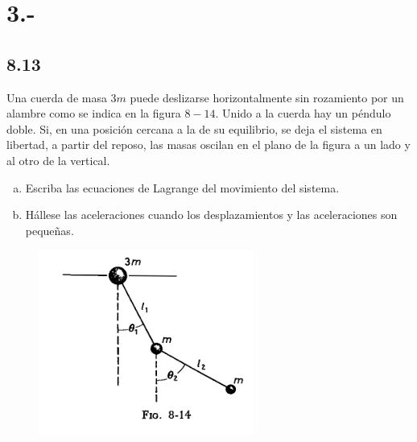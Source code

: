 \documentclass{article}
\begin{document}
\section*{3.-}
\subsection*{8.13}
Una cuerda de masa $3m$ puede deslizarse horizontalmente sin rozamiento por un alambre 
como se indica en la figura $8-14$. Unido a la cuerda hay un péndulo doble. Si, en una 
posición cercana a la de su equilibrio, se deja el sistema en libertad, a partir del
reposo, las masas oscilan en el plano de la figura a un lado y al otro de la vertical.
\begin{enumerate}[a)]
    \item Escriba las ecuaciones de Lagrange del movimiento del sistema.
    \item Hállese las aceleraciones cuando los desplazamientos y las aceleraciones son pequeñas.
\end{enumerate}
\begin{figure}[H]
    \centering
    \includegraphics[scale=0.8]{p3_pendulum.png}
\end{figure}
\end{document}
